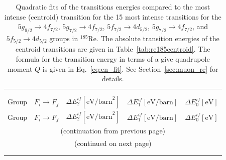 \begin{longtable}{c c | r r r}
\caption{\label{tab:re185energ}%
Quadratic fits of the transitions energies compared to the most intense (centroid) transition for the 15 most intense transitions for the $5g_{9/2}\rightarrow4f_{7/2}$, $5g_{7/2}\rightarrow4f_{7/2}$, $5f_{7/2}\rightarrow4d_{5/2}$, $5g_{7/2}\rightarrow4f_{7/2}$, and $5f_{5/2}\rightarrow4d_{5/2}$ groups in $^{185}$Re. The absolute transition energies of the centroid transitions are given in Table~\ref{tab:re185centroid}. The formula for the transition energy in terms of a give quadrupole moment $Q$ is given in Eq.~\eqref{eq:en_fit}. See Section~\ref{sec:muon_re} for details.}\\
\\\hline\\[-10pt]\hline\\[-10pt]
\centering
Group& $F_i \rightarrow F_f$ & $\Delta E_2^{if} [\text{eV/barn}^2]$ & $\Delta E_1^{if} [\text{eV/barn}]$ & $\Delta E_0^{if} [\text{eV}]$\\[1pt]\hline
\endfirsthead

Group& $F_i \rightarrow F_f$ & $\Delta E_2^{if} [\text{eV/barn}^2]$ & $\Delta E_1^{if} [\text{eV/barn}]$ & $\Delta E_0^{if} [\text{eV}]$\\[1pt]\hline
\multicolumn{5}{c}{{(continuation from previous page)}}\\
\endhead

\multicolumn{5}{c}{{(continued on next page)}}\\ \endfoot
\hline \\[-10pt] \hline \endlastfoot


\end{longtable}
